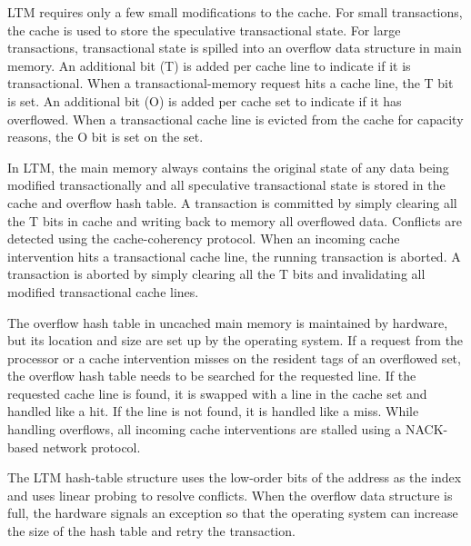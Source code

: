 LTM requires only a few small modifications to the cache.  For small
transactions, the cache is used to store the speculative transactional
state. For large transactions, transactional state is spilled into an
overflow data structure in main memory. An additional bit (T) is added
per cache line to indicate if it is transactional. When a
transactional-memory request hits a cache line, the T bit is set. An
additional bit (O) is added per cache set to indicate if it has
overflowed. When a transactional cache line is evicted from the cache
for capacity reasons, the O bit is set on the set.

In LTM, the main memory always contains the original state of any data
being modified transactionally and all speculative transactional state
is stored in the cache and overflow hash table. A transaction is
committed by simply clearing all the T bits in cache and writing back
to memory all overflowed data. Conflicts are detected using the
cache-coherency protocol. When an incoming cache intervention hits a
transactional cache line, the running transaction is aborted. A
transaction is aborted by simply clearing all the T bits and
invalidating all modified transactional cache lines.

The overflow hash table in uncached main memory is maintained by
hardware, but its location and size are set up by the operating
system.  If a request from the processor or a cache intervention misses
on the resident tags of an overflowed set, the overflow hash table
needs to be searched for the requested line. If the requested cache
line is found, it is swapped with a line in the cache set and handled
like a hit.  If the line is not found, it is handled like a miss.
While handling overflows, all incoming cache interventions are stalled
using a NACK-based network protocol.

The LTM hash-table structure uses the low-order bits of the address as
the index and uses linear probing to resolve conflicts. When the
overflow data structure is full, the hardware signals an exception so
that the operating system can increase the size of the hash table and
retry the transaction.


